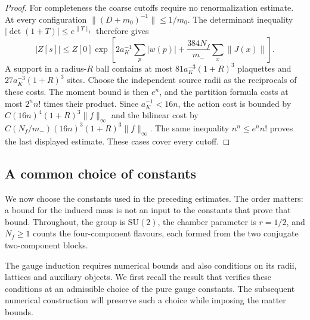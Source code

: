 \documentclass[11pt,letterpaper,reqno]{amsart}
\theoremstyle{definition}
\theoremstyle{remark}
\begin{document}
\begin{proof}
For completeness the coarse cutoffs require no
renormalization estimate. At every configuration
$\|(D+m_0)^{-1}\|\le1/m_0$. The determinant inequality
$|\det(1+T)|\le e^{\|T\|_1}$ therefore gives
\[
 |Z[s]|\le Z[0]\exp\left[
 2a_K^{-1}\sum_p|w(p)|+
 \frac{384N_f}{m_-}\sum_x\|J(x)\|\right].
\]
A support in a radius-$R$ ball contains at most
$81a_K^{-3}(1+R)^3$ plaquettes and
$27a_K^{-3}(1+R)^3$ sites. Choose the independent
source radii as the reciprocals of these costs.
The moment bound is then $e^n$, and the partition
formula costs at most $2^nn!$ times their product.
Since $a_K^{-1}<16n$, the action cost is bounded by
$C(16n)^4(1+R)^3\|f\|_\infty$ and the bilinear cost
by $C(N_f/m_-)(16n)^3(1+R)^3\|f\|_\infty$.
The same inequality $n^n\le e^nn!$ proves the last
displayed estimate. These cases cover every cutoff.
\end{proof}

\subsection{A common choice of constants}

We now choose the constants used in the preceding estimates.
The order matters: a bound for the induced mass is not an
input to the constants that prove that bound. Throughout,
the group is $\mathrm{SU}(2)$, the chamber parameter is $r=1/2$,
and $N_f\ge1$ counts the four-component flavours, each formed
from the two conjugate two-component blocks.

The gauge induction requires numerical bounds and also conditions
on its radii, lattices and auxiliary objects. We first recall the
result that verifies these conditions at an admissible choice of
the pure gauge constants. The subsequent numerical construction
will preserve such a choice while imposing the matter bounds.
\end{document}
